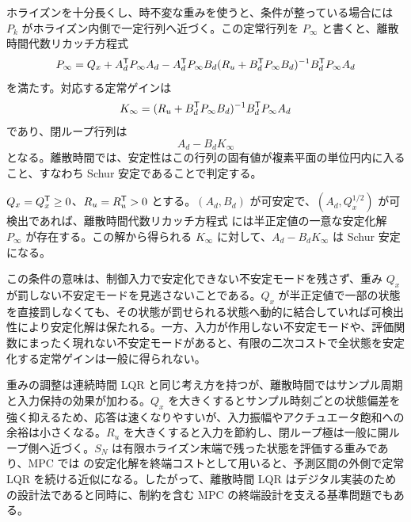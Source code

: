 ホライズンを十分長くし、時不変な重みを使うと、条件が整っている場合には $P_k$ がホライズン内側で一定行列へ近づく。この定常行列を $P_\infty$ と書くと、離散時間代数リカッチ方程式
\begin{equation}
  P_\infty
  =
  Q_x+A_d^{\mathsf{T}} P_\infty A_d
  -A_d^{\mathsf{T}} P_\infty B_d
  (R_u+B_d^{\mathsf{T}} P_\infty B_d)^{-1}
  B_d^{\mathsf{T}} P_\infty A_d
  \label{eq:dare}
\end{equation}
を満たす。対応する定常ゲインは
\begin{equation}
  K_\infty
  =
  (R_u+B_d^{\mathsf{T}} P_\infty B_d)^{-1}
  B_d^{\mathsf{T}} P_\infty A_d
  \label{eq:dlqr-infinite-gain}
\end{equation}
であり、閉ループ行列は
\begin{equation}
  A_d-B_d K_\infty
  \label{eq:dlqr-closed-loop}
\end{equation}
となる。離散時間では、安定性はこの行列の固有値が複素平面の単位円内に入ること、すなわち Schur 安定であることで判定する。

\begin{theorem}
$Q_x=Q_x^{\mathsf{T}}\ge0$、$R_u=R_u^{\mathsf{T}}>0$ とする。$(A_d,B_d)$ が可安定で、$(A_d,Q_x^{1/2})$ が可検出であれば、離散時間代数リカッチ方程式  には半正定値の一意な安定化解 $P_\infty$ が存在する。この解から得られる $K_\infty$ に対して、$A_d-B_d K_\infty$ は Schur 安定になる。
\end{theorem}

この条件の意味は、制御入力で安定化できない不安定モードを残さず、重み $Q_x$ が罰しない不安定モードを見逃さないことである。$Q_x$ が半正定値で一部の状態を直接罰しなくても、その状態が罰せられる状態へ動的に結合していれば可検出性により安定化解は保たれる。一方、入力が作用しない不安定モードや、評価関数にまったく現れない不安定モードがあると、有限の二次コストで全状態を安定化する定常ゲインは一般に得られない。

重みの調整は連続時間 LQR と同じ考え方を持つが、離散時間ではサンプル周期と入力保持の効果が加わる。$Q_x$ を大きくするとサンプル時刻ごとの状態偏差を強く抑えるため、応答は速くなりやすいが、入力振幅やアクチュエータ飽和への余裕は小さくなる。$R_u$ を大きくすると入力を節約し、閉ループ極は一般に開ループ側へ近づく。$S_N$ は有限ホライズン末端で残った状態を評価する重みであり、MPC では  の安定化解を終端コストとして用いると、予測区間の外側で定常 LQR を続ける近似になる。したがって、離散時間 LQR はデジタル実装のための設計法であると同時に、制約を含む MPC の終端設計を支える基準問題でもある。
